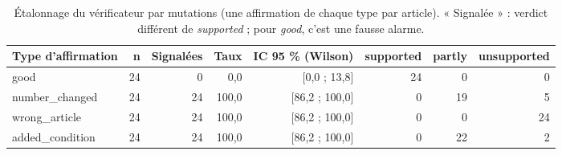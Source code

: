 \begin{table}[H]
\centering
\small
\begin{tabular}{lrrrrrrr}
\toprule
Type d'affirmation & n & Signalées & Taux & IC 95 \% (Wilson) & supported & partly & unsupported \\
\midrule
good & 24 & 0 & 0{,}0 & [0{,}0 ; 13{,}8] & 24 & 0 & 0 \\
number\_changed & 24 & 24 & 100{,}0 & [86{,}2 ; 100{,}0] & 0 & 19 & 5 \\
wrong\_article & 24 & 24 & 100{,}0 & [86{,}2 ; 100{,}0] & 0 & 0 & 24 \\
added\_condition & 24 & 24 & 100{,}0 & [86{,}2 ; 100{,}0] & 0 & 22 & 2 \\
\bottomrule
\end{tabular}
\caption{Étalonnage du vérificateur par mutations (une affirmation de chaque type par article). « Signalée » : verdict différent de \emph{supported} ; pour \emph{good}, c'est une fausse alarme.}
\label{tab:calib}
\end{table}
